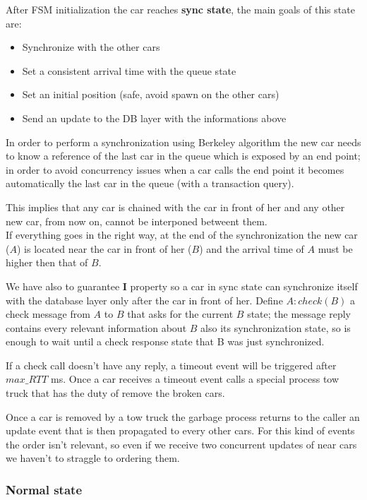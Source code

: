 After FSM initialization the car reaches \textbf{sync state}, the main goals 
of this state are:

\begin{itemize}
    \item Synchronize with the other cars
    \item Set a consistent arrival time with the queue state 
    \item Set an initial position (safe, avoid spawn on the other cars)
    \item Send an update to the DB layer with the informations above
\end{itemize}

\noindent
In order to perform a synchronization using Berkeley algorithm the new car needs to 
know a reference of the last car in the queue which is exposed by an end point; 
in order to avoid concurrency issues when a car calls the end point 
it becomes automatically the last car in the queue (with a transaction query).

This implies that any car is chained with the car in front of her and any other 
new car, from now on, cannot be interponed betweent them.\\

\noindent
If everything goes in the right way, at the end of the synchronization the new car ($A$) 
is located near the car in front of her ($B$) and the arrival time of $A$ must be 
higher then that of $B$.

We have also to guarantee \textbf{I} property so a car in sync state can synchronize 
itself with the database layer only after the car in front of her. Define 
$A:check(B)$ a check message from $A$ to $B$ that asks for the current $B$ state;
the message reply contains every relevant information about $B$ also its synchronization 
state, so is enough to wait until a check response state that B was just 
synchronized.  

If a check call doesn't have any reply, a timeout event will be triggered after 
$max\_RTT$ ms. Once a car receives a timeout event calls a special process 
tow truck that has the duty of remove the broken cars.  

Once a car is removed by a tow truck the garbage process returns to the caller 
an update event that is then propagated to every other cars. For this kind of events 
the order isn't relevant, so even if we receive two concurrent updates of near cars 
we haven't to straggle to ordering them.


\subsubsection{Normal state}

